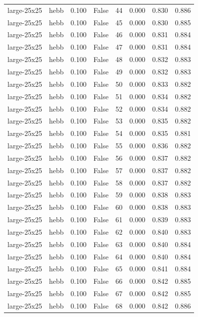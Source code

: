 \begin{tabular}{llrrrrrr}
large-25x25 & hebb & 0.100 & False & 44 & 0.000 & 0.830 & 0.886 \\
large-25x25 & hebb & 0.100 & False & 45 & 0.000 & 0.830 & 0.885 \\
large-25x25 & hebb & 0.100 & False & 46 & 0.000 & 0.831 & 0.884 \\
large-25x25 & hebb & 0.100 & False & 47 & 0.000 & 0.831 & 0.884 \\
large-25x25 & hebb & 0.100 & False & 48 & 0.000 & 0.832 & 0.883 \\
large-25x25 & hebb & 0.100 & False & 49 & 0.000 & 0.832 & 0.883 \\
large-25x25 & hebb & 0.100 & False & 50 & 0.000 & 0.833 & 0.882 \\
large-25x25 & hebb & 0.100 & False & 51 & 0.000 & 0.834 & 0.882 \\
large-25x25 & hebb & 0.100 & False & 52 & 0.000 & 0.834 & 0.882 \\
large-25x25 & hebb & 0.100 & False & 53 & 0.000 & 0.835 & 0.882 \\
large-25x25 & hebb & 0.100 & False & 54 & 0.000 & 0.835 & 0.881 \\
large-25x25 & hebb & 0.100 & False & 55 & 0.000 & 0.836 & 0.882 \\
large-25x25 & hebb & 0.100 & False & 56 & 0.000 & 0.837 & 0.882 \\
large-25x25 & hebb & 0.100 & False & 57 & 0.000 & 0.837 & 0.882 \\
large-25x25 & hebb & 0.100 & False & 58 & 0.000 & 0.837 & 0.882 \\
large-25x25 & hebb & 0.100 & False & 59 & 0.000 & 0.838 & 0.883 \\
large-25x25 & hebb & 0.100 & False & 60 & 0.000 & 0.838 & 0.883 \\
large-25x25 & hebb & 0.100 & False & 61 & 0.000 & 0.839 & 0.883 \\
large-25x25 & hebb & 0.100 & False & 62 & 0.000 & 0.840 & 0.883 \\
large-25x25 & hebb & 0.100 & False & 63 & 0.000 & 0.840 & 0.884 \\
large-25x25 & hebb & 0.100 & False & 64 & 0.000 & 0.840 & 0.884 \\
large-25x25 & hebb & 0.100 & False & 65 & 0.000 & 0.841 & 0.884 \\
large-25x25 & hebb & 0.100 & False & 66 & 0.000 & 0.842 & 0.885 \\
large-25x25 & hebb & 0.100 & False & 67 & 0.000 & 0.842 & 0.885 \\
large-25x25 & hebb & 0.100 & False & 68 & 0.000 & 0.842 & 0.886 \\

\end{tabular}
